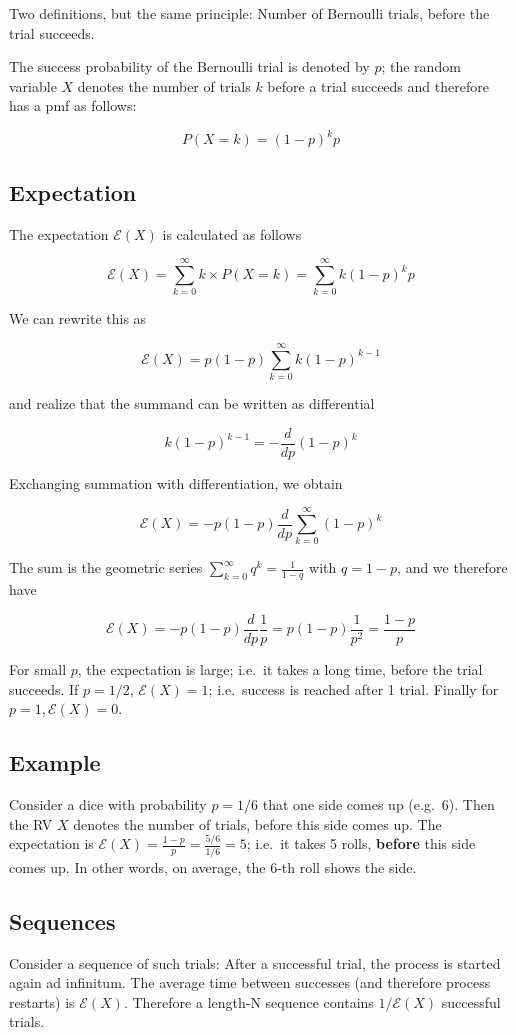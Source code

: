 
Two definitions, but the same principle: Number of Bernoulli trials, before the trial succeeds.

The success probability of the Bernoulli trial is denoted by $p$; the random variable $X$ denotes the number of trials $k$ before a trial succeeds and therefore has a pmf as follows:

\[ P(X=k) = (1-p)^k p\]

\subsection{Expectation}

The expectation $\mathcal{E}(X)$ is calculated as follows

\[\mathcal{E}(X) = \sum_{k=0}^\infty k \times P(X=k) = \sum_{k=0}^\infty k (1-p)^k p \]

We can rewrite this as

\[\mathcal{E}(X) = p(1-p) \sum_{k=0}^\infty k (1-p)^{k-1} \]

and realize that the summand can be written as differential

\[k(1-p)^{k-1} = - \frac{d}{dp} (1-p)^k\]

Exchanging summation with differentiation, we obtain

\[\mathcal{E}(X) = -p(1-p) \frac{d}{dp} \sum_{k=0}^\infty (1-p)^k \]

The sum is the geometric series
$\sum_{k=0}^\infty q^k = \frac{1}{1-q}$ with $q=1-p$, and we therefore have

\[\mathcal{E}(X) = -p(1-p) \frac{d}{dp} \frac{1}{p} = p(1-p)\frac{1}{p^2} = \frac{1-p}{p}\]

For small $p$, the expectation is large; i.e.~it takes a long time, before the trial succeeds. If $p=1/2$, $\mathcal{E}(X)=1$; i.e.~success is reached after 1 trial. Finally for $p=1, \mathcal{E}(X)=0$.

\subsection{Example}

Consider a dice with probability $p=1/6$ that one side comes up (e.g.~6). Then the RV $X$ denotes the number of trials, before this side comes up. The expectation is $\mathcal{E}(X) = \frac{1-p}{p} = \frac{5/6}{1/6} = 5$; i.e.~it takes 5 rolls, \textbf{before} this side comes up. In other words, on average, the 6-th roll shows the side.

\subsection{Sequences}

Consider a sequence of such trials: After a successful trial, the process is started again ad infinitum. The average time between successes (and therefore process restarts) is $\mathcal{E}(X)$. Therefore a length-N sequence contains $1/\mathcal{E}(X)$ successful trials.
